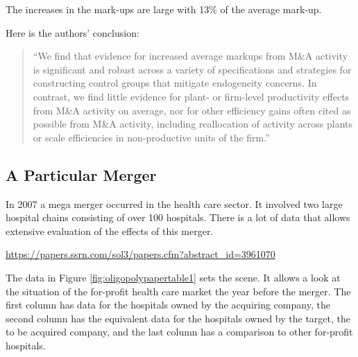 \documentclass[
]{book}
\begin{document}
The increases in the mark-ups are large with 13\% of the average mark-up.

Here is the authors' conclusion:

\begin{quote}
``We find that evidence for increased average markups from M\&A activity is significant and robust across a variety of specifications and strategies for constructing control groups that mitigate endogeneity concerns. In contrast, we find little evidence for plant- or firm-level productivity effects from M\&A activity on average, nor for other efficiency gains often cited as possible from M\&A activity, including reallocation of activity across plants or scale efficiencies in non-productive units of the firm.''
\end{quote}

\hypertarget{a-particular-merger}{%
\subsection{A Particular Merger}\label{a-particular-merger}}

In 2007 a mega merger occurred in the health care sector. It involved two large hospital chains consisting of over 100 hospitals. There is a lot of data that allows extensive evaluation of the effects of this merger.

\url{https://papers.ssrn.com/sol3/papers.cfm?abstract_id=3961070}

The data in Figure \ref{fig:oligopolypapertable1} sets the scene. It allows a look at the situation of the for-profit health care market the year before the merger. The first column has data for the hospitals owned by the acquiring company, the second column has the equivalent data for the hospitals owned by the target, the to be acquired company, and the last column has a comparison to other for-profit hospitals.
\end{document}
